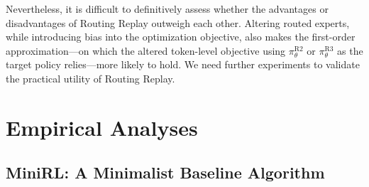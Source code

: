 \documentclass{article}
\begin{document}
Nevertheless, it is difficult to definitively assess whether the advantages or disadvantages of Routing Replay outweigh each other.
Altering routed experts, while introducing bias into the optimization objective, also makes the first-order approximation—on which the altered token-level objective using \( \pi^\text{R2}_\theta \) or \( \pi^\text{R3}_\theta \) as the target policy relies—more likely to hold.
We need further experiments to validate the practical utility of Routing Replay.

\section{Empirical Analyses}
\label{sec:exp}

\subsection{MiniRL: A Minimalist Baseline Algorithm}
\end{document}
